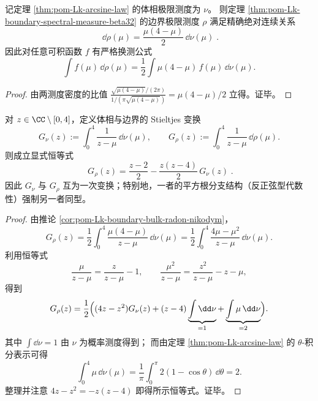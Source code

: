\begin{corollary}\label{cor:pom-Lk-boundary-bulk-radon-nikodym}
记定理 \ref{thm:pom-Lk-arcsine-law} 的体相极限测度为 \(\nu\)。
则定理 \ref{thm:pom-Lk-boundary-spectral-measure-beta32} 的边界极限测度 \(\rho\) 满足精确绝对连续关系
\[
\boxed{\;
\dd\rho(\mu)=\frac{\mu(4-\mu)}{2}\,\dd\nu(\mu)\; }.
\]
因此对任意可积函数 \(f\) 有严格换测公式
\[
\int f(\mu)\,\dd\rho(\mu)=\frac12\int \mu(4-\mu)\,f(\mu)\,\dd\nu(\mu).
\]
\end{corollary}

\begin{proof}
由两测度密度的比值
\(
\frac{\sqrt{\mu(4-\mu)}/(2\pi)}{1/(\pi\sqrt{\mu(4-\mu)})}=\mu(4-\mu)/2
\)
立得。证毕。
\end{proof}

\begin{corollary}\label{cor:pom-Lk-stieltjes-linear-rigidity}
对 \(z\in\CC\setminus[0,4]\)，定义体相与边界的 Stieltjes 变换
\[
G_\nu(z):=\int_{0}^{4}\frac{1}{z-\mu}\,\dd\nu(\mu),
\qquad
G_\rho(z):=\int_{0}^{4}\frac{1}{z-\mu}\,\dd\rho(\mu).
\]
则成立显式恒等式
\[
\boxed{\;
G_\rho(z)=\frac{z-2}{2}-\frac{z(z-4)}{2}\,G_\nu(z)\; }.
\]
因此 \(G_\nu\) 与 \(G_\rho\) 互为一次变换；特别地，一者的平方根分支结构（反正弦型代数性）强制另一者同型。
\end{corollary}
\begin{proof}
由推论 \ref{cor:pom-Lk-boundary-bulk-radon-nikodym}，
\[
G_\rho(z)=\frac12\int_{0}^{4}\frac{\mu(4-\mu)}{z-\mu}\,\dd\nu(\mu)
=\frac12\int_{0}^{4}\frac{4\mu-\mu^2}{z-\mu}\,\dd\nu(\mu).
\]
利用恒等式
\[
\frac{\mu}{z-\mu}=\frac{z}{z-\mu}-1,
\qquad
\frac{\mu^2}{z-\mu}=\frac{z^2}{z-\mu}-z-\mu,
\]
得到
\[
G_\rho(z)
=\frac12\Bigl((4z-z^2)G_\nu(z)+(z-4)\underbrace{\int\dd\nu}_{=1}+\underbrace{\int\mu\,\dd\nu}_{=2}\Bigr).
\]
其中 \(\int\dd\nu=1\) 由 \(\nu\) 为概率测度得到；
而由定理 \ref{thm:pom-Lk-arcsine-law} 的 \(\theta\)-积分表示可得
\[
\int_{0}^{4}\mu\,\dd\nu(\mu)
=\frac{1}{\pi}\int_{0}^{\pi}2(1-\cos\theta)\,\dd\theta
=2.
\]
整理并注意 \(4z-z^2=-z(z-4)\) 即得所示恒等式。证毕。
\end{proof}

